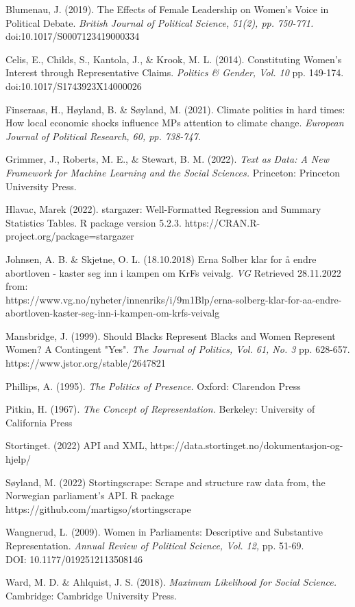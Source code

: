 \documentclass[12pt]{article}
\begin{document}
	{\parindent-10pt
	Blumenau, J. (2019). The Effects of Female Leadership on Women’s Voice in Political Debate. \textit{British Journal of Political Science, 51(2), pp. 750-771.} doi:10.1017/S0007123419000334 
	
	Celis, E., Childs, S., Kantola, J., \& Krook, M. L. (2014). Constituting Women's Interest through Representative Claims. \textit{Politics \& Gender, Vol. 10} pp. 149-174. \\ doi:10.1017/S1743923X14000026 
	
	Finseraas, H., Høyland, B. \& Søyland, M. (2021). Climate politics in hard times: How local economic shocks influence MPs attention to climate change. \textit{European Journal of Political Research, 60, pp. 738-747.}
	
	Grimmer, J., Roberts, M. E., \& Stewart, B. M. (2022). \textit{Text as Data: A New Framework for Machine Learning and the Social Sciences.} Princeton: Princeton University Press.
	
	Hlavac, Marek (2022). stargazer: Well-Formatted Regression and Summary Statistics Tables. R package version 5.2.3. https://CRAN.R-project.org/package=stargazer
	
	Johnsen, A. B. \& Skjetne, O. L. (18.10.2018) Erna Solber klar for å endre abortloven - kaster seg inn i kampen om KrFs veivalg. \textit{VG} Retrieved 28.11.2022 from: \\ https://www.vg.no/nyheter/innenriks/i/9m1Blp/erna-solberg-klar-for-aa-endre-abortloven-kaster-seg-inn-i-kampen-om-krfs-veivalg
	
	Mansbridge, J. (1999). Should Blacks Represent Blacks and Women Represent Women? A Contingent "Yes". \textit{The Journal of Politics, Vol. 61, No. 3} pp. 628-657. \\ https://www.jstor.org/stable/2647821 
	
	Phillips, A. (1995). \textit{The Politics of Presence.} Oxford: Clarendon Press
	
	Pitkin, H. (1967). \textit{The Concept of Representation.} Berkeley: University of California Press
	
	Stortinget. (2022) API and XML, https://data.stortinget.no/dokumentasjon-og-hjelp/ 
	
	Søyland, M. (2022) Stortingscrape: Scrape and structure raw data from, the Norwegian parliament’s API. R package https://github.com/martigso/stortingscrape 
	
	Wangnerud, L. (2009). Women in Parliaments: Descriptive and Substantive Representation. \textit{Annual Review of Political Science, Vol. 12,} pp. 51-69. \\ DOI: 10.1177/0192512113508146
	
	Ward, M. D. \& Ahlquist, J. S. (2018). \textit{Maximum Likelihood for Social Science.} Cambridge: Cambridge University Press.
}
	
\end{document}
